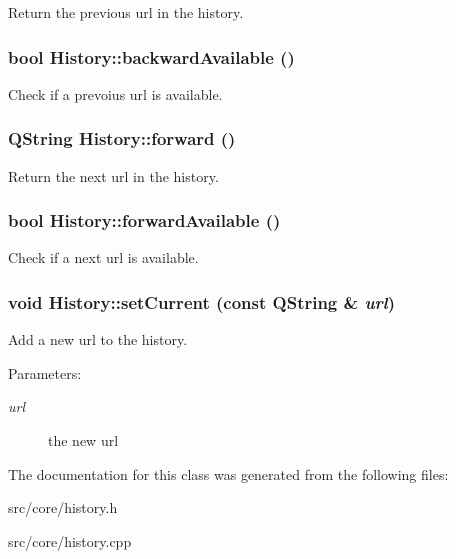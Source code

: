Return the previous url in the history. \hypertarget{classHistory_c8c3f249e76605c9686eacb4716c79b4}{
\subsubsection[{backwardAvailable}]{\setlength{\rightskip}{0pt plus 5cm}bool History::backwardAvailable ()}}
\label{classHistory_c8c3f249e76605c9686eacb4716c79b4}


Check if a prevoius url is available. \hypertarget{classHistory_83d69c4bfe79d19a6187f586e7311b22}{
\subsubsection[{forward}]{\setlength{\rightskip}{0pt plus 5cm}QString History::forward ()}}
\label{classHistory_83d69c4bfe79d19a6187f586e7311b22}


Return the next url in the history. \hypertarget{classHistory_1227493ba04f3f640c6648b9562bf68e}{
\subsubsection[{forwardAvailable}]{\setlength{\rightskip}{0pt plus 5cm}bool History::forwardAvailable ()}}
\label{classHistory_1227493ba04f3f640c6648b9562bf68e}


Check if a next url is available. \hypertarget{classHistory_7fd72e5b7289c61f32ec5d533d0356bf}{
\subsubsection[{setCurrent}]{\setlength{\rightskip}{0pt plus 5cm}void History::setCurrent (const QString \& {\em url})}}
\label{classHistory_7fd72e5b7289c61f32ec5d533d0356bf}


Add a new url to the history. \begin{Desc}
\item[Parameters:]
\begin{description}
\item[{\em url}]the new url \end{description}
\end{Desc}


The documentation for this class was generated from the following files:\begin{CompactItemize}
\item 
src/core/history.h\item 
src/core/history.cpp\end{CompactItemize}
